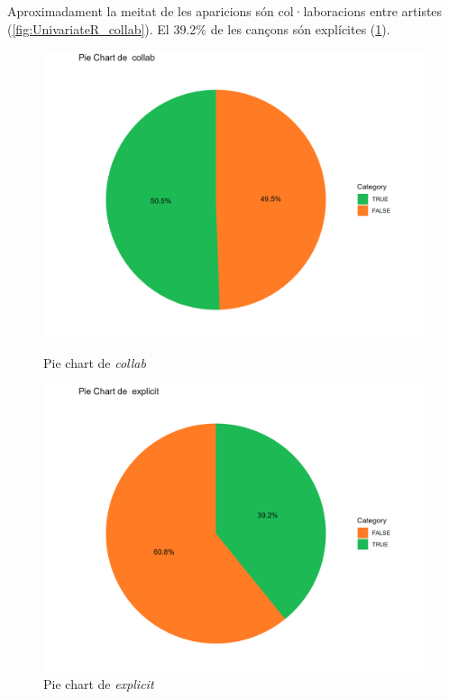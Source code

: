 Aproximadament la meitat de les aparicions són col·laboracions entre artistes (\ref{fig:UnivariateR_collab}). El 39.2\% de les cançons són explícites (\ref{fig:UnivariateR_explicit}).

\begin{figure}[H]
\centering
    \begin{minipage}{.4\textwidth}
        \centering
        \includegraphics[width=0.95\linewidth]{Images/2_Univariate/pie_collab.png}
        \caption{Pie chart de \textit{collab}}
        \label{fig:UnivariateR_collab}
    \end{minipage}%
    \begin{minipage}{.4\textwidth}
        \centering
        \includegraphics[width=0.95\linewidth]{Images/2_Univariate/pie_explicit.png}
        \caption{Pie chart de \textit{explicit}}
        \label{fig:UnivariateR_explicit}
    \end{minipage}%
\end{figure}

